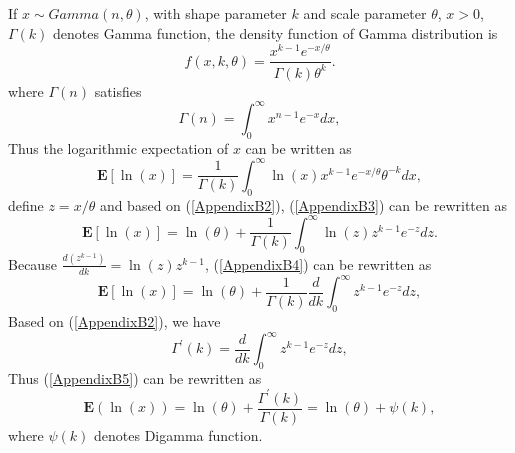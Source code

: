 \documentclass[12pt, draftclsnofoot, onecolumn]{IEEEtran}
\begin{document}
\section{}\label{proof log expectation gamma}
If $x\sim Gamma(n, \theta)$, with shape parameter $k$ and scale parameter $\theta$, $x>0$, $\Gamma(k)$ denotes Gamma function, the density function of Gamma distribution is
\begin{equation}
f(x,k,\theta)=\frac{x^{k-1}e^{-x/\theta}}{\Gamma(k)\theta^{k}}.
\label{AppendixB1}
\end{equation}
where $\Gamma(n)$ satisfies\cite{papoulis2002probability}
\begin{equation}
\Gamma(n)=\int_{0}^{\infty}x^{n-1}e^{-x}dx,
\label{AppendixB2}
\end{equation}
Thus the logarithmic expectation of $x$ can be written as
\begin{equation}
\mathbf{E}[\ln(x)]=\frac{1}{\Gamma(k)}\int_{0}^{\infty}\ln(x)x^{k-1}e^{-x/\theta}\theta^{-k}dx,
\label{AppendixB3}
\end{equation}
define $z=x/\theta$ and based on (\ref{AppendixB2}), (\ref{AppendixB3}) can be rewritten as
\begin{equation}
\mathbf{E}[\ln(x)]=\ln(\theta)+\frac{1}{\Gamma(k)}\int_{0}^{\infty}\ln(z)z^{k-1}e^{-z}dz.
\label{AppendixB4}
\end{equation}
Because $\frac{d(z^{k-1})}{dk}=\ln(z)z^{k-1}$, (\ref{AppendixB4}) can be rewritten as
\begin{equation}
\mathbf{E}[\ln(x)]=\ln(\theta)+\frac{1}{\Gamma(k)}\frac{d}{dk}\int_{0}^{\infty}z^{k-1}e^{-z}dz,
\label{AppendixB5}
\end{equation}
Based on (\ref{AppendixB2}), we have
\begin{equation}
\Gamma^{'}(k)=\frac{d}{dk}\int_{0}^{\infty}z^{k-1}e^{-z}dz,
\label{AppendixB6}
\end{equation}
Thus (\ref{AppendixB5}) can be rewritten as
\begin{equation}
\mathbf{E}(\ln(x))=\ln(\theta)+\frac{\Gamma^{'}(k)}{\Gamma(k)}=\ln(\theta)+\psi(k),
\label{AppendixB6}
\end{equation}
where $\psi(k)$ denotes Digamma function.




\end{document}
